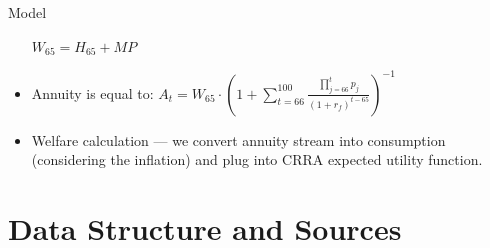 \documentclass{beamer}
\begin{document}
\begin{frame}[allowframebreaks]{Model}
\begin{itemize}
\begin{center}
$	W_{65} = H_{65} + MP$
\end{center}

	\item Annuity is equal to:
$	A_t = W_{65} \cdot \left(1+\sum^{100}_{t=66} \frac{\prod^{t}_{j=66} p_j }{(1+r_f)^{t-65}} \right)^{-1}$	
	\item Welfare calculation --- we convert annuity stream into consumption (considering the inflation) and plug into CRRA expected utility function.

  \end{itemize}
\end{frame}

\section{Data Structure and Sources}
\end{document}
